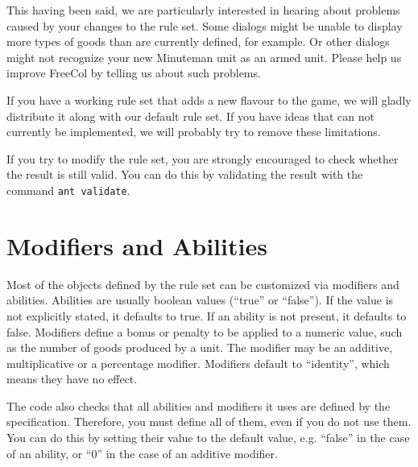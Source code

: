\documentclass[12pt]{book}
\begin{document}
This having been said, we are particularly interested in hearing about
problems caused by your changes to the rule set. Some dialogs might be
unable to display more types of goods than are currently defined, for
example. Or other dialogs might not recognize your new Minuteman unit
as an armed unit. Please help us improve FreeCol by telling us about
such problems.

If you have a working rule set that adds a new flavour to the game, we
will gladly distribute it along with our default rule set. If you have
ideas that can not currently be implemented, we will probably try to
remove these limitations.

If you try to modify the rule set, you are strongly encouraged to
check whether the result is still valid. You can do this by validating
the result with the command \verb$ant validate$.


\hypertarget{Modifiers and Abilities}{\section{Modifiers and Abilities}}

Most of the objects defined by the rule set can be customized via
modifiers and abilities.  Abilities are usually boolean values
(``true'' or ``false''). If the value is not explicitly stated, it
defaults to true. If an ability is not present, it defaults to
false. Modifiers define a bonus or penalty to be applied to a numeric
value, such as the number of goods produced by a unit. The modifier
may be an additive, multiplicative or a percentage modifier. Modifiers
default to ``identity'', which means they have no effect.

The code also checks that all abilities and modifiers it uses are
defined by the specification. Therefore, you must define all of them,
even if you do not use them. You can do this by setting their value to
the default value, e.g. ``false'' in the case of an ability, or ``0''
in the case of an additive modifier.
\end{document}
